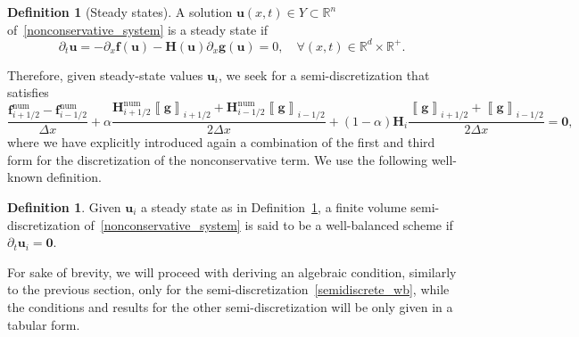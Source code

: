 \documentclass[]{scrartcl}
\renewcommand{\vec}[1]{\boldsymbol{#1}}
\newcommand{\jump}[1]{\left\llbracket #1  \right\rrbracket}
\theoremstyle{definition}
\newtheorem{definition}[theorem]{Definition}
\begin{document}
\begin{definition}[Steady states]\label{steady_state_definition}
    A solution $\vec{u}(x,t) \in Y \subset \mathbb{R}^n$ of~\eqref{nonconservative_system} is a steady state if
    \begin{equation}
   \partial_t \vec{u} = -\partial_x \vec{f}(\vec{u}) - \vec{H}(\vec{u}) \partial_x \vec{g}(\vec{u}) = 0, \quad \forall (x,t) \in \mathbb{R}^d \times \mathbb{R}^+.
    \end{equation}
\end{definition}
Therefore, given steady-state values $\vec{u}_i$, we seek for a semi-discretization that satisfies
\begin{equation}
\frac{\vec{f}^{\mathrm{num}}_{i+1/2} - \vec{f}^{\mathrm{num}}_{i-1/2}}{\Delta x} + \alpha \frac{\vec{H}^{\mathrm{num}}_{i+1/2} \jump{\vec{g}}_{i+1/2} + \vec{H}^{\mathrm{num}}_{i-1/2}\jump{\vec{g}}_{i-1/2}} {2 \Delta x} + (1-\alpha) \vec{H}_i \frac{\jump{\vec{g}}_{i+1/2} + \jump{\vec{g}}_{i-1/2}} {2 \Delta x}= \vec{0},
\label{semidiscrete_wb}
\end{equation}
where we have explicitly introduced again a combination of the first and third form for the discretization of the nonconservative term.
We use the following well-known definition.
\begin{definition}
    \label{finite_volume_wb}
Given $\vec{u}_i$ a steady state as in Definition~\ref{steady_state_definition}, a finite volume semi-discretization of~\eqref{nonconservative_system} is said to be a well-balanced scheme if $\partial_t \vec{u}_i = \vec{0}$.
\end{definition}
For sake of brevity, we will proceed with deriving an algebraic condition, similarly to the previous section, only for the semi-discretization~\eqref{semidiscrete_wb}, while the conditions and results for the other semi-discretization will be only given in a tabular form.
\end{document}
